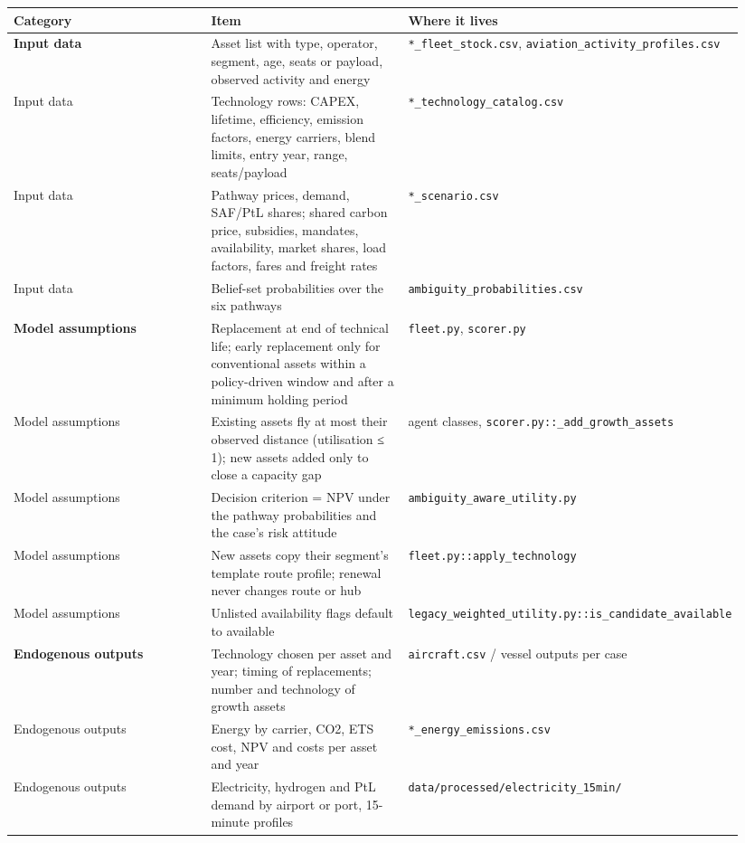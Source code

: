 \documentclass[11pt,a4paper]{article}
\begin{document}
{\small\setlength{\tabcolsep}{3pt}
\begin{longtable}{>{\raggedright\arraybackslash}p{0.315\linewidth}>{\raggedright\arraybackslash}p{0.315\linewidth}>{\raggedright\arraybackslash}p{0.315\linewidth}}
\toprule
\textbf{Category} & \textbf{Item} & \textbf{Where it lives} \tabularnewline
\midrule
\endhead
\textbf{Input data} & Asset list with type, operator, segment, age, seats or payload, observed activity and energy & \texttt{*\_\allowbreak{}fleet\_\allowbreak{}stock.\allowbreak{}csv}, \texttt{aviation\_\allowbreak{}activity\_\allowbreak{}profiles.\allowbreak{}csv} \tabularnewline
Input data & Technology rows: CAPEX, lifetime, efficiency, emission factors, energy carriers, blend limits, entry year, range, seats/payload & \texttt{*\_\allowbreak{}technology\_\allowbreak{}catalog.\allowbreak{}csv} \tabularnewline
Input data & Pathway prices, demand, SAF/PtL shares; shared carbon price, subsidies, mandates, availability, market shares, load factors, fares and freight rates & \texttt{*\_\allowbreak{}scenario.\allowbreak{}csv} \tabularnewline
Input data & Belief-set probabilities over the six pathways & \texttt{ambiguity\_\allowbreak{}probabilities.\allowbreak{}csv} \tabularnewline
\textbf{Model assumptions} & Replacement at end of technical life; early replacement only for conventional assets within a policy-driven window and after a minimum holding period & \texttt{fleet.\allowbreak{}py}, \texttt{scorer.\allowbreak{}py} \tabularnewline
Model assumptions & Existing assets fly at most their observed distance (utilisation ≤ 1); new assets added only to close a capacity gap & agent classes, \texttt{scorer.\allowbreak{}py::\_\allowbreak{}add\_\allowbreak{}growth\_\allowbreak{}assets} \tabularnewline
Model assumptions & Decision criterion = NPV under the pathway probabilities and the case's risk attitude & \texttt{ambiguity\_\allowbreak{}aware\_\allowbreak{}utility.\allowbreak{}py} \tabularnewline
Model assumptions & New assets copy their segment's template route profile; renewal never changes route or hub & \texttt{fleet.\allowbreak{}py::apply\_\allowbreak{}technology} \tabularnewline
Model assumptions & Unlisted availability flags default to available & \texttt{legacy\_\allowbreak{}weighted\_\allowbreak{}utility.\allowbreak{}py::is\_\allowbreak{}candidate\_\allowbreak{}available} \tabularnewline
\textbf{Endogenous outputs} & Technology chosen per asset and year; timing of replacements; number and technology of growth assets & \texttt{aircraft.\allowbreak{}csv} / vessel outputs per case \tabularnewline
Endogenous outputs & Energy by carrier, CO2, ETS cost, NPV and costs per asset and year & \texttt{*\_\allowbreak{}energy\_\allowbreak{}emissions.\allowbreak{}csv} \tabularnewline
Endogenous outputs & Electricity, hydrogen and PtL demand by airport or port, 15-minute profiles & \texttt{data/\allowbreak{}processed/\allowbreak{}electricity\_\allowbreak{}15min/\allowbreak{}} \tabularnewline
\bottomrule
\end{longtable}}
\end{document}
